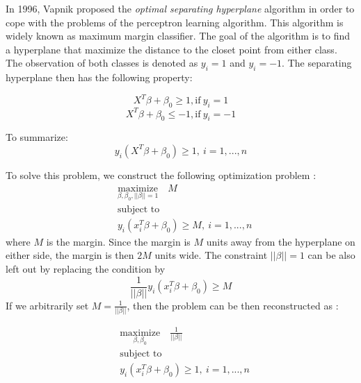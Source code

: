 In 1996, Vapnik proposed the \emph{optimal separating hyperplane} algorithm in order to cope with the problems of the perceptron learning algorithm.
This algorithm is widely known as maximum margin classifier.
The goal of the algorithm is to find a hyperplane that maximize the distance to the closet point from either class.
The observation of both classes is denoted as $y_i = 1$ and $y_i = -1$. The separating hyperplane then has the following property:

\begin{equation}
    X^T \beta + \beta_0 \geq 1, \text{if}\ y_i = 1
\end{equation}
\begin{equation}
    X^T \beta + \beta_0 \leq -1, \text{if}\ y_i = -1
\end{equation}

To summarize:
\begin{equation}
    y_i(X^T \beta + \beta_0) \geq 1,\ i = 1, ..., n
\end{equation}

To solve this problem, we construct the following optimization problem \cite{R9}:
\begin{equation}
    \begin{aligned}
      & \underset{\textstyle {\beta, \beta_0, ||\beta||=1}}{\text{maximize}} \quad
        M \\
      & \text{subject to} \\
      & y_i(x_i^T \beta + \beta_0) \geq M,\ i = 1, ..., n
    \end{aligned}
\end{equation}
where $M$ is the margin. Since the margin is $M$ units away from the hyperplane on either side,
the margin is then $2M$ units wide. The constraint $||\beta|| = 1$ can be also left out by replacing
the condition by
\begin{equation}
    \frac{1}{||\beta||}y_i(x_i^T \beta + \beta_0) \geq M
\end{equation}
If we arbitrarily set $M = \frac{1}{||\beta||}$, then the problem can be then reconstructed as \cite{Elements4}:

\begin{equation}
    \begin{aligned}
      & \underset{\textstyle {\beta, \beta_0}}{\text{maximize}} \quad
        \frac 1 {||\beta||} \\
      & \text{subject to} \\
      & y_i(x_i^T \beta + \beta_0) \geq 1,\ i = 1, ..., n
    \end{aligned}
\end{equation}

